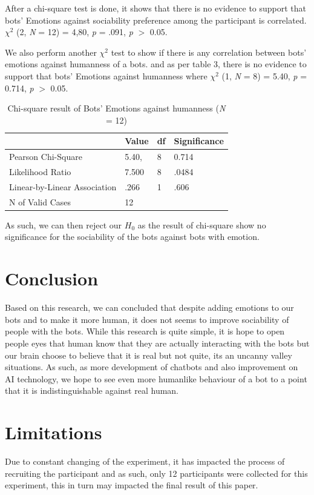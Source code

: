 \documentclass{vgtc}                          %
\begin{document}
After a chi-square test is done, it shows that there is no evidence to support that bots' Emotions against sociability 
preference among the participant is correlated. $\chi^2$ (2, \textit{N} = 12) = 4,80, \textit{p} = .091, \textit{p} $>$ 0.05.

We also perform another $\chi^2$ test to show if there is any correlation between bots' emotions against humanness of a bots. and as per table 3, there is no evidence to support that bots' Emotions against humanness where
$\chi^2$ (1, \textit{N} = 8) = 5.40, \textit{p} = 0.714, \textit{p} $>$ 0.05.

{
\begin{table}[ht]
\centering
\begin{tabular}{llll}
  & \textbf{Value} & \textbf{df} & \textbf{Significance}  \\  \hline
 Pearson Chi-Square & 5.40, & 8 & 0.714 \\  \hline
 Likelihood Ratio & 7.500 & 8 &  .0484 \\ \hline
 Linear-by-Linear Association &  .266 & 1 & .606  \\ \hline
 N of Valid Cases &  12 &  & \\  \hline
\end{tabular}
\caption{Chi-square result of Bots' Emotions against humanness (\textit{N} = 12)}
\label{tab:my-table}
\end{table}
}

As such, we can then reject our $H_0$ as the result of chi-square show no significance for the sociability of the bots against bots with emotion.

\section{Conclusion}
Based on this research, we can concluded that despite adding emotions to our bots and to make it more human, it does not seems to improve sociability of people with the bots. While this research is quite simple, it is hope to open people eyes that human know that they are actually interacting with the bots but our brain choose to believe that it is real but not quite, its an uncanny valley situations. As such, as more development of chatbots and also improvement on AI technology, we hope to see even more humanlike behaviour of a bot to a point that it is indistinguishable against real human.

\section{Limitations}
Due to constant changing of the experiment, it has impacted the process of recruiting the participant and as such, only 12 participants were collected for this experiment, this in turn may impacted the final result of this paper. 
\end{document}
